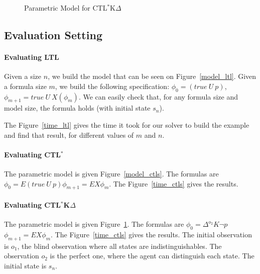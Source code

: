 \documentclass[dvipsnames]{acmart}
\def\ctls{CTL$^{*}$}
\def\ctlskd{CTL$^{*}$K$\Delta$}
\def\ltl{LTL}
\def\E{\mathit{E}}
\def\U{\mathit{U}}
\def\X{\mathit{X}}
\def\K{\mathit{K}}
\def\D#1{\Delta^{#1}}
\begin{document}
\begin{figure}[!h]
  \centering
  \caption{Parametric Model for \ctlskd}
  \label{model_ctlskd}
\end{figure}

\subsection{Evaluation Setting}
\paragraph{Evaluating \ltl}
Given a size $n$, we build the model that can be seen on Figure~\ref{model_ltl}.
Given a formula size $m$, we build the following specification:
$\phi_0 = (true~\U~p)$,\quad $\phi_{m+1} = true~\U~\X (\phi_m)$.
We can easily check that, for any formula size and model size, the formula holds (with initial state $s_n$).

The Figure~\ref{time_ltl} gives the time it took for our solver to build the example and find that result, for different values of $m$ and $n$.

\paragraph{Evaluating \ctls}
The parametric model is given Figure~\ref{model_ctls}.
The formulas are $\phi_0 = \E(true~\U~p)$\quad$\phi_{m+1} = \E\X\phi_m$.
The Figure~\ref{time_ctls} gives the results.

\paragraph{Evaluating \ctlskd}
The parametric model is given Figure~\ref{model_ctlskd}.
The formulas are $\phi_0 = \D{o_2}\K\neg p$\quad$\phi_{m+1} =\E\X\phi_m$.
The Figure~\ref{time_ctls} gives the results.
The initial observation is $o_1$, the blind observation where all states are indistinguishables.
The observation $o_2$ is the perfect one, where the agent can distinguish each state.
The initial state is $s_n$.
\end{document}
